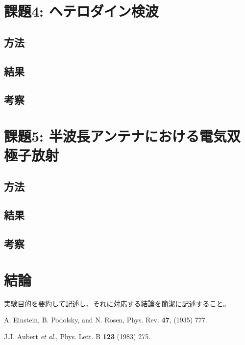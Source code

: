 \documentclass[uplatex,dvipdfmx,a4j,12pt]{jsarticle}
\begin{document}
\section{課題4: ヘテロダイン検波}
\subsection{方法}

\subsection{結果}

\subsection{考察}


\section{課題5: 半波長アンテナにおける電気双極子放射}
\subsection{方法}

\subsection{結果}

\subsection{考察}


\section{結論}
実験目的を要約して記述し、それに対応する結論を簡潔に記述すること。


\begin{thebibliography}{9}

        A. Einstein, B. Podolsky, and N. Rosen, 
        Phys. Rev. \textbf{47}, (1935) 777.

        J.J. Aubert \textit{et al.},
        Phys. Lett. B \textbf{123} (1983) 275.
    
\end{thebibliography}
\end{document}
